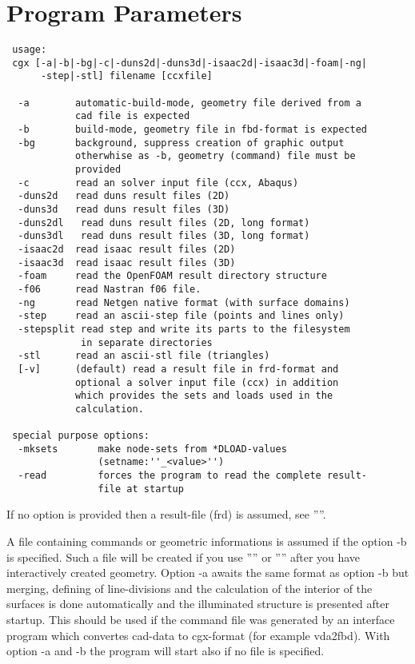 \documentclass{article}
\begin{document}
\section{\label{Program Parameters}Program Parameters}
\begin{verbatim}
 usage:
 cgx [-a|-b|-bg|-c|-duns2d|-duns3d|-isaac2d|-isaac3d|-foam|-ng|
      -step|-stl] filename [ccxfile]

  -a        automatic-build-mode, geometry file derived from a 
            cad file is expected
  -b        build-mode, geometry file in fbd-format is expected
  -bg       background, suppress creation of graphic output
            otherwhise as -b, geometry (command) file must be
            provided
  -c        read an solver input file (ccx, Abaqus)              
  -duns2d   read duns result files (2D)                                  
  -duns3d   read duns result files (3D)
  -duns2dl   read duns result files (2D, long format)
  -duns3dl   read duns result files (3D, long format)
  -isaac2d  read isaac result files (2D)                                  
  -isaac3d  read isaac result files (3D)                                  
  -foam     read the OpenFOAM result directory structure
  -f06      read Nastran f06 file.    
  -ng       read Netgen native format (with surface domains)    
  -step     read an ascii-step file (points and lines only)                                  
  -stepsplit read step and write its parts to the filesystem
             in separate directories
  -stl      read an ascii-stl file (triangles)                                  
  [-v]      (default) read a result file in frd-format and
            optional a solver input file (ccx) in addition 
            which provides the sets and loads used in the
            calculation.

 special purpose options:                                               
  -mksets       make node-sets from *DLOAD-values 
                (setname:''_<value>'')
  -read         forces the program to read the complete result-
                file at startup
\end{verbatim}
If no option is provided then a result-file (frd) is assumed, see ''''.

A file containing commands or geometric informations is assumed if the option -b is specified. Such a file will be created if you use '''' or '''' after you have interactively created geometry. Option -a awaits the same format as option -b but merging, defining of line-divisions and the calculation of the interior of the surfaces is done automatically and the illuminated structure is presented after startup. This should be used if the command file was generated by an interface program which convertes cad-data to cgx-format (for example vda2fbd). With option -a and -b the program will start also if no file is specified. 
\end{document}
